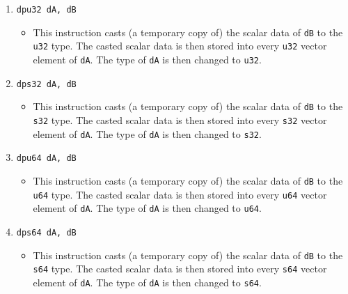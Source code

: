 \documentclass{article}
\begin{document}
\begin{itemize}
\begin{enumerate}
			\item \texttt{dpu32 dA, dB}
				\begin{itemize}
				\item This instruction casts (a temporary copy of) the
					scalar data of \texttt{dB} to the \texttt{u32} type.
					The casted scalar data is then stored into every
					\texttt{u32} vector element of \texttt{dA}. The type of
					\texttt{dA} is then changed to \texttt{u32}.
				\end{itemize}
			\item \texttt{dps32 dA, dB}
				\begin{itemize}
				\item This instruction casts (a temporary copy of) the
					scalar data of \texttt{dB} to the \texttt{s32} type.
					The casted scalar data is then stored into every
					\texttt{s32} vector element of \texttt{dA}. The type of
					\texttt{dA} is then changed to \texttt{s32}.
				\end{itemize}
			\item \texttt{dpu64 dA, dB}
				\begin{itemize}
				\item This instruction casts (a temporary copy of) the
					scalar data of \texttt{dB} to the \texttt{u64} type.
					The casted scalar data is then stored into every
					\texttt{u64} vector element of \texttt{dA}. The type of
					\texttt{dA} is then changed to \texttt{u64}.
				\end{itemize}
			\item \texttt{dps64 dA, dB}
				\begin{itemize}
				\item This instruction casts (a temporary copy of) the
					scalar data of \texttt{dB} to the \texttt{s64} type.
					The casted scalar data is then stored into every
					\texttt{s64} vector element of \texttt{dA}. The type of
					\texttt{dA} is then changed to \texttt{s64}.
				\end{itemize}
			\end{enumerate}
		\end{itemize}
		\newpage
\end{document}

